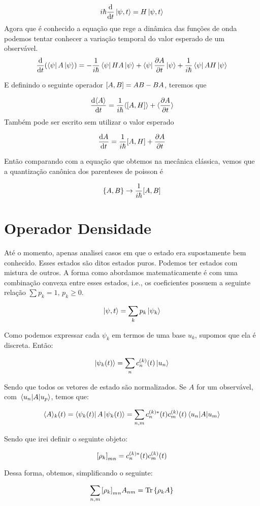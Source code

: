 \documentclass{article}
\begin{document}
	\[i\hbar \dv{t} \ket{\psi,t}=H\ket{\psi,t}\]
	Agora que é conhecido a equação que rege a dinâmica das funções de onda podemos tentar conhecer a variação temporal do valor esperado de um observável.
	$$\dv{t}(\bra{\psi}A\ket{\psi})=-\frac{1}{i\hbar}\bra{\psi}HA\ket{\psi}+\bra{\psi} \pdv{A}{t} \ket{\psi}+\frac{1}{i\hbar}\bra{\psi}AH\ket{\psi}$$ 
	
	E definindo o seguinte operador $\qty[A,B]=AB-BA$, teremos que
	
	$$\dv{\langle A \rangle}{t}=\frac{1}{i\hbar}\langle\qty[A,H] \rangle+\langle\pdv{A}{t} \rangle$$
	Também pode ser escrito sem utilizar o valor esperado
	
	$$\dv{A}{t}=\frac{1}{i\hbar}\qty[A,H]+\pdv{A}{t}$$
	
	Então comparando com a equação que obtemos na mecânica clássica, vemos que a quantização canônica dos parenteses de poisson é
	
	$$ \qty{A, B} \to \frac{1}{i\hbar}\qty[A,B]$$
	
	\newpage
	\section{Operador Densidade}
	
	Até o momento, apenas analisei casos em que o estado era supostamente bem conhecido. Esses estados são ditos estados puros. Podemos ter estados com mistura de outros. A forma como abordamos matematicamente é com uma combinação convexa entre esses estados, i.e., os coeficientes possuem a seguinte relação $\sum p_k=1, \,p_k \geq0$.
	
	$$\ket{\psi,t}=\sum_k p_k \ket{\psi_k}$$
	
	Como podemos expressar cada $\psi_k$ em termos de uma base $u_k$, supomos que ela é discreta. Então:
	
	$$\ket{\psi_k(t)}=\sum_n c_n^{(k)}(t) \ket{u_n}$$
	

	
	Sendo que todos os vetores de estado são normalizados. Se $A$ for um observável, com $\mel{u_n}{A}{u_p}$, temos que:
	
	$$\langle A \rangle_k(t)=\bra{\psi_k(t)}A\ket{\psi_k(t)}=\sum_{n,m} c_n^{(k)*}(t) c_m^{(k)}(t) \mel{u_n}{A}{u_m}$$
	
	Sendo que irei definir o seguinte objeto:
	
	$$\qty[\rho_k]_{mn}=c_n^{(k)*}(t)c_m^{(k)}(t)$$
	
	Dessa forma, obtemos, simplificando o seguinte:
	
	$$\sum_{n,m} \qty[\rho_k]_{mn}A_{nm}=\Tr \qty{\rho_k A}$$
	
\end{document}
